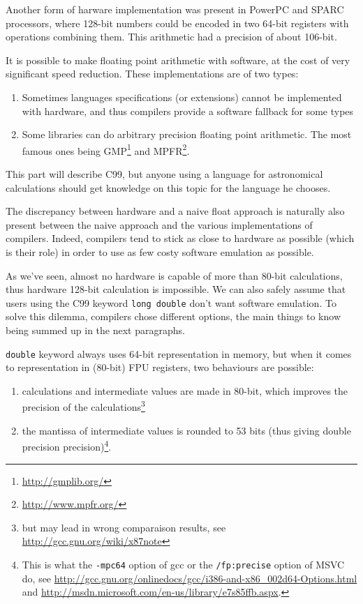 Another form of harware implementation was present in PowerPC and SPARC processors, where 128-bit numbers could be encoded in two 64-bit registers with operations combining them. This arithmetic had a precision of about 106-bit.


It is possible to make floating point arithmetic with software, at the cost of very significant speed reduction. These implementations are of two types:

\begin{enumerate}
\item[\enumstyle{Compiler}] Sometimes languages specifications (or extensions) cannot be implemented with hardware, and thus compilers provide a software fallback for some types
\item[\enumstyle{Libraries}] Some libraries can do arbitrary precision floating point arithmetic. The most famous ones being GMP\footnote{\url{http://gmplib.org/}} and MPFR\footnote{\url{http://www.mpfr.org/}}.
\end{enumerate}


This part will describe C99, but anyone using a language for astronomical calculations should get knowledge on this topic for the language he chooses.

The discrepancy between hardware and a naive float approach is naturally also present between the naive approach and the various implementations of compilers. Indeed, compilers tend to stick as close to hardware as possible (which is their role) in order to use as few costy software emulation as possible. 

As we've seen, almost no hardware is capable of more than 80-bit calculations, thus hardware 128-bit calculation is impossible. We can also safely assume that users using the C99 keyword \texttt{long double} don't want software emulation. To solve this dilemma, compilers chose different options, the main things to know being summed up in the next paragraphs.


\texttt{double} keyword always uses 64-bit representation in memory, but when it comes to representation in (80-bit) FPU registers, two behaviours are possible:
\begin{enumerate}
\item[\enumstyle{80-bit mode}] calculations and intermediate values are made in 80-bit, which improves the precision of the calculations\footnote{but may lead in wrong comparaison results, see \url{http://gcc.gnu.org/wiki/x87note}}
\item[\enumstyle{64-bit mode}] the mantissa of intermediate values is rounded to 53 bits (thus giving double precision precision)\footnote{This is what the \texttt{-mpc64} option of gcc or the \texttt{/fp:precise} option of MSVC do, see \url{http://gcc.gnu.org/onlinedocs/gcc/i386-and-x86\_002d64-Options.html} and \url{http://msdn.microsoft.com/en-us/library/e7s85ffb.aspx}.}.
\end{enumerate}

